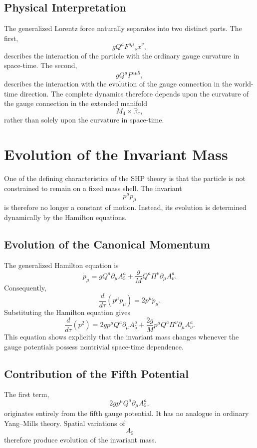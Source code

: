 \subsection{Physical Interpretation}
The generalized Lorentz force naturally separates into two distinct
parts.
The first,
\[gQ^aF^{a\mu}{}_{\nu}\dot x^\nu,\]
describes the interaction of the particle with the ordinary gauge
curvature in space-time.
The second,
\[gQ^aF^{a\mu5},\]
describes the interaction with the evolution of the gauge connection in
the world-time direction.
The complete dynamics therefore depends upon the curvature of the gauge
connection in the extended manifold
\[M_4\times\mathbb{R}_\tau,\]
rather than solely upon the curvature in space-time.
\section{Evolution of the Invariant Mass}
One of the defining characteristics of the SHP theory is that the
particle is not constrained to remain on a fixed mass shell.
The invariant
\[p^\mu p_\mu\]
is therefore no longer a constant of motion.
Instead,
its evolution is determined dynamically by the Hamilton equations.
\subsection{Evolution of the Canonical Momentum}
The generalized Hamilton equation is
\[\dot p_\mu=gQ^a\partial_\mu A_5^a+\frac{g}{M}Q^a\Pi^\nu\partial_\mu A_\nu^a.\]
Consequently,
\[\frac{d}{d\tau}(p^\mu p_\mu)=2p^\mu\dot p_\mu.\]
Substituting the Hamilton equation gives
\[\boxed{\frac{d}{d\tau}(p^2)=2gp^\mu Q^a\partial_\mu A_5^a
+\frac{2g}{M}p^\mu Q^a\Pi^\nu\partial_\mu A_\nu^a.}\]
This equation shows explicitly that the invariant mass changes whenever
the gauge potentials possess nontrivial space-time dependence.
\subsection{Contribution of the Fifth Potential}
The first term,
\[2gp^\mu Q^a\partial_\mu A_5^a,\]
originates entirely from the fifth gauge potential.
It has no analogue in ordinary Yang--Mills theory.
Spatial variations of
\[A_5\]
therefore produce evolution of the invariant mass.
